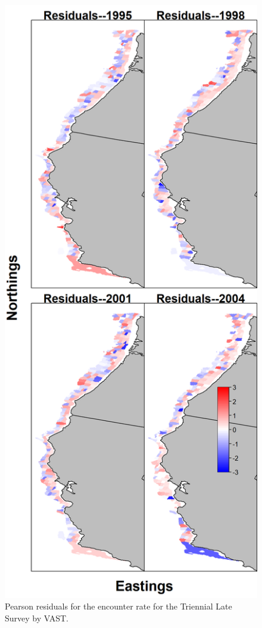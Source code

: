 \documentclass[12pt,]{article}
\begin{document}
\begin{figure}
\centering
\includegraphics{Figures/tri_late_maps--encounter_pearson_resid.png}
\caption{Pearson residuals for the encounter rate for the Triennial Late
Survey by VAST. \label{fig:tri_late_enc_rate}}
\end{figure}
\end{document}
